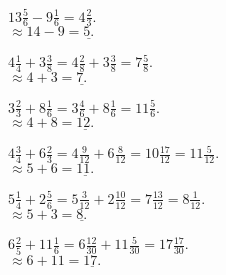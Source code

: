 \documentclass[12pt]{article}
\newenvironment{problem}[2][Problem]{\begin{trivlist}
\item[\hskip \labelsep {\bfseries #1}\hskip \labelsep {\bfseries #2.}]}{\end{trivlist}}
\begin{document}
\begin{problem}{10}
$13 \frac{5}{6} - 9 \frac{1}{6} = \boxed{4 \frac{2}{3}.}$ \\
$\approx 14 - 9 = \underline{5.}$
\end{problem}

\begin{problem}{11}
$4 \frac{1}{4} + 3 \frac{3}{8} = 4 \frac{2}{8} + 3 \frac{3}{8} = \boxed{7 \frac{5}{8}.}$ \\
$\approx 4 + 3 = \underline{7.}$
\end{problem}

\begin{problem}{12}
$3 \frac{2}{3} + 8 \frac{1}{6} = 3 \frac{4}{6} + 8 \frac{1}{6} = \boxed{11 \frac{5}{6}.}$ \\
$\approx 4 + 8 = \underline{12.}$
\end{problem}

\begin{problem}{13}
$4 \frac{3}{4} + 6 \frac{2}{3} = 4 \frac{9}{12} + 6 \frac{8}{12} = 10 \frac{17}{12} = \boxed{11 \frac{5}{12}.}$ \\
$\approx 5 + 6 = \underline{11.}$
\end{problem}

\begin{problem}{14}
$5 \frac{1}{4} + 2 \frac{5}{6} = 5 \frac{3}{12} + 2 \frac{10}{12} = 7 \frac{13}{12} = \boxed{8 \frac{1}{12}.}$ \\
$\approx 5 + 3 = \underline{8.}$
\end{problem}

\begin{problem}{15}
$6 \frac{2}{5} + 11 \frac{1}{6} = 6 \frac{12}{30} + 11 \frac{5}{30} = \boxed{17 \frac{17}{30}.}$ \\
$\approx 6 + 11 = \underline{17.}$
\end{problem}
\end{document}
